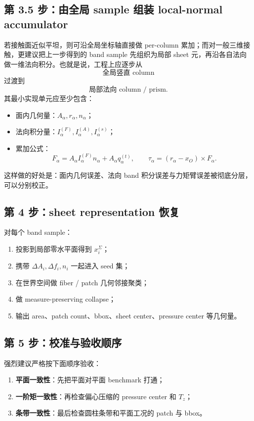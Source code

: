 \documentclass[12pt,a4paper]{ctexart}
\begin{document}
\subsection{第 3.5 步：由全局 sample 组装 local-normal accumulator}
若接触面近似平坦，则可沿全局坐标轴直接做 per-column 累加；而对一般三维接触，更建议把上一步得到的 band sample 先组织为局部 sheet 元，再沿各自法向做一维法向积分。也就是说，工程上应逐步从
\[
\text{全局竖直 column}
\]
过渡到
\[
\text{局部法向 column / prism}.
\]
其最小实现单元应至少包含：
\begin{itemize}
    \item 面内几何量：$A_\alpha,r_\alpha,n_\alpha$；
    \item 法向积分量：$I_\alpha^{(F)},I_\alpha^{(A)},I_\alpha^{(s)}$；
    \item 累加公式：
    \begin{equation}
        F_\alpha = A_\alpha I_\alpha^{(F)} n_\alpha + A_\alpha q_\alpha^{(t)},
        \qquad
        \tau_\alpha = (r_\alpha-x_O)\times F_\alpha.
    \end{equation}
\end{itemize}
这样做的好处是：面内几何误差、法向 band 积分误差与力矩臂误差被彻底分层，可以分别校正。

\subsection{第 4 步：sheet representation 恢复}
对每个 band sample：
\begin{enumerate}
    \item 投影到局部零水平面得到 $x_i^{\Sigma}$；
    \item 携带 $\Delta A_i, \Delta f_i, n_i$ 一起进入 seed 集；
    \item 在世界空间做 fiber / patch 几何邻接聚类；
    \item 做 measure-preserving collapse；
    \item 输出 area、patch count、bbox、sheet center、pressure center 等几何量。
\end{enumerate}

\subsection{第 5 步：校准与验收顺序}
强烈建议严格按下面顺序验收：
\begin{enumerate}
    \item \textbf{平面一致性}：先把平面对平面 benchmark 打通；
    \item \textbf{一阶矩一致性}：再检查偏心压缩的 pressure center 和 $T_z$；
    \item \textbf{条带一致性}：最后检查圆柱条带和平面工况的 patch 与 bbox。
\end{enumerate}
\end{document}

